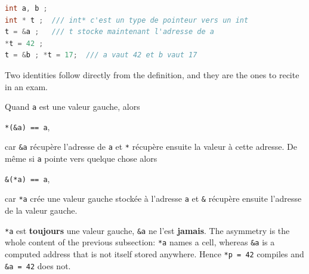 \begin{lstlisting}[language=C]
int a, b ;
int * t ;  /// int* c'est un type de pointeur vers un int
t = &a ;   /// t stocke maintenant l'adresse de a
*t = 42 ;
t = &b ; *t = 17;  /// a vaut 42 et b vaut 17
\end{lstlisting}

\begin{figure}[h!]
  \centering
\end{figure}

Two identities follow directly from the definition, and they are the ones to
recite in an exam.

\begin{prop}
  Quand \verb|a| est une valeur gauche, alors
  \begin{center}
    \verb|*(&a) == a|,
  \end{center}
  car \verb|&a| récupère l'adresse de \verb|a| et \verb|*| récupère ensuite la
  valeur à cette adresse. De même si \verb|a| pointe vers quelque chose alors
  \begin{center}
    \verb|&(*a) == a|,
  \end{center}
  car \verb|*a| crée une valeur gauche stockée à l'adresse \verb|a| et \verb|&|
  récupère ensuite l'adresse de la valeur gauche.
\end{prop}

\begin{remark}
  \verb|*a| est \textbf{toujours} une valeur gauche, \verb|&a| ne l'est
  \textbf{jamais}. The asymmetry is the whole content of the previous subsection: \verb|*a|
  names a cell, whereas \verb|&a| is a computed address that is not itself
  stored anywhere. Hence \verb|*p = 42| compiles and \verb|&a = 42| does not.
\end{remark}

